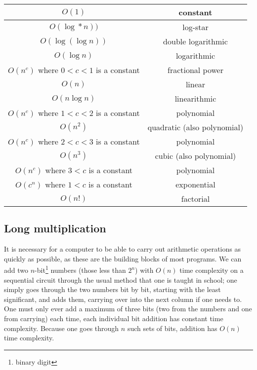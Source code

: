 \documentclass[12pt,a4paper]{report}
\begin{document}
\begin{multicols}{2}
\begin{multicols}{2}
\end{multicols}

\begin{center}
	\begin{tabular}{c|c}
		\(O(1)\)&constant\\\hline
		\(O(\log*n))\)&log-star\footnotemark\\\hline
		\(O(\log(\log{}n))\)&double logarithmic\\\hline
		\(O(\log{}n)\)&logarithmic\\\hline
		\(O(n^c)\) where \(0<c<1\) is a constant&fractional power\\\hline
		\(O(n)\)&linear\\\hline
		\(O(n\log{}n)\)&linearithmic\\\hline
		\(O(n^c)\) where \(1<c<2\) is a constant&polynomial\\\hline
		\(O(n^2)\)&quadratic (also polynomial)\\\hline
		\(O(n^c)\) where \(2<c<3\) is a constant&polynomial\\\hline
		\(O(n^3)\)&cubic (also polynomial)\\\hline
		\(O(n^c)\) where \(3<c\) is a constant&polynomial\\\hline
		\(O(c^n)\) where \(1<c\) is a constant&exponential\\\hline
		\(O(n!)\)&factorial
	\end{tabular}
\end{center}

\begin{multicols}{2}
	
\subsection{Long multiplication}
It is necessary for a computer to be able to carry out arithmetic operations as quickly as possible, as these are the building blocks of most programs. We can add two \(n\)-bit\footnote{binary digit} numbers (those less than \(2^n\)) with \(O(n)\) time complexity on a sequential circuit through the usual method that one is taught in school; one simply goes through the two numbers bit by bit, starting with the least significant, and adds them, carrying over into the next column if one needs to. One must only ever add a maximum of three bits (two from the numbers and one from carrying) each time, each individual bit addition has constant time complexity. Because one goes through \(n\) such sets of bits, addition has \(O(n)\) time complexity.


\end{multicols}
\end{multicols}
\end{document}
